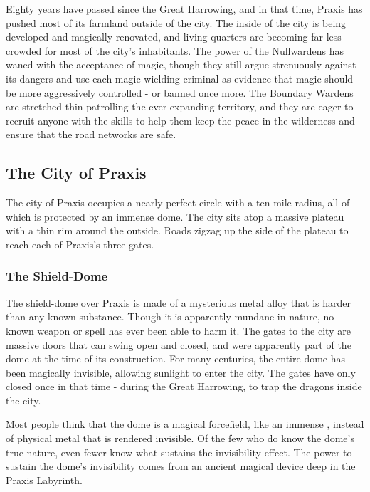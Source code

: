             Eighty years have passed since the Great Harrowing, and in that time, Praxis has pushed most of its farmland outside of the city.
            The inside of the city is being developed and magically renovated, and living quarters are becoming far less crowded for most of the city's inhabitants.
            The power of the Nullwardens has waned with the acceptance of magic, though they still argue strenuously against its dangers and use each magic-wielding criminal as evidence that magic should be more aggressively controlled - or banned once more.
            The Boundary Wardens are stretched thin patrolling the ever expanding territory, and they are eager to recruit anyone with the skills to help them keep the peace in the wilderness and ensure that the road networks are safe.

    \subsection{The City of Praxis}
        The city of Praxis occupies a nearly perfect circle with a ten mile radius, all of which is protected by an immense dome.
        The city sits atop a massive plateau with a thin rim around the outside.
        Roads zigzag up the side of the plateau to reach each of Praxis's three gates.

        \subsubsection{The Shield-Dome}
            The shield-dome over Praxis is made of a mysterious metal alloy that is harder than any known substance.
            Though it is apparently mundane in nature, no known weapon or spell has ever been able to harm it.
            The gates to the city are massive doors that can swing open and closed, and were apparently part of the dome at the time of its construction.
            For many centuries, the entire dome has been magically invisible, allowing sunlight to enter the city.
            The gates have only closed once in that time - during the Great Harrowing, to trap the dragons inside the city.

            Most people think that the dome is a magical forcefield, like an immense , instead of physical metal that is rendered invisible.
            Of the few who do know the dome's true nature, even fewer know what sustains the invisibility effect.
            The power to sustain the dome's invisibility comes from an ancient magical device deep in the Praxis Labyrinth.

